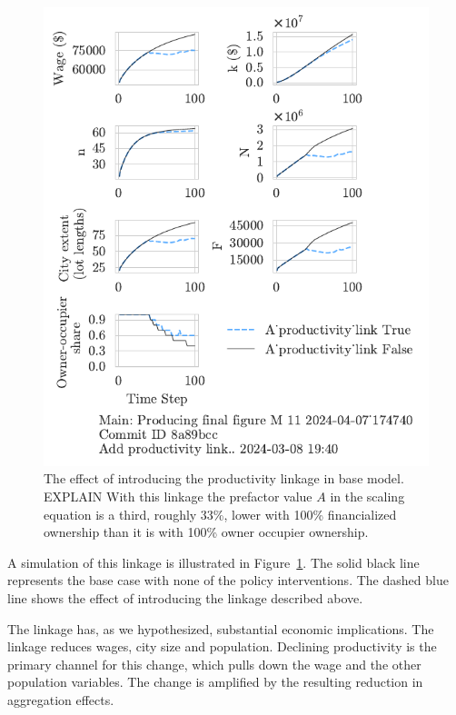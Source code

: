 \begin{figure}[h!tb] 
    \centering
    \includegraphics[scale=1, trim={0 1.4cm .8cm 0},clip]{fig/productivity_link_174740.pdf} 
    \caption[The effect of introducing the productivity linkage in base model]{The effect of introducing the productivity linkage in base model. {\color{red} EXPLAIN} With this linkage the prefactor value $A$ in the scaling equation is a third, roughly 33\%, lower with 100\% financialized ownership than it is with 100\% owner occupier ownership.}
    \label{fig-impact-channel-example}
\end{figure}


A simulation of this linkage is illustrated in Figure~\ref{fig-impact-channel-example}. The solid black line represents the base case with none of the policy interventions. The dashed blue line shows the effect of introducing the linkage described above. 

The linkage has, as we hypothesized, substantial economic implications. The linkage reduces wages, city size and population. 
Declining productivity is the primary channel for this change, which pulls down the wage and the other population variables. The change is amplified by the resulting reduction in aggregation effects. 


